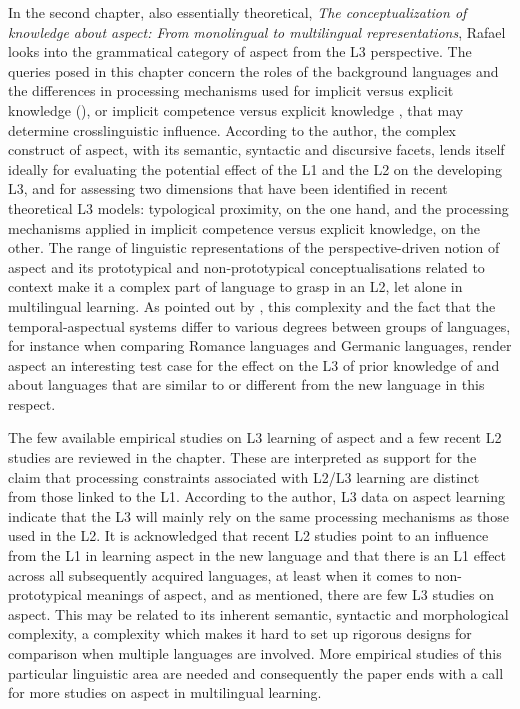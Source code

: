 \documentclass[output=paper,colorlinks,citecolor=brown,nonflat]{langsci/langscibook}
\begin{document}
In the second chapter, also essentially theoretical, \textit{The conceptualization of knowledge about aspect: From monolingual to multilingual representations}, Rafael \citeauthor{chapters/salaberry} looks into the grammatical category of aspect from the L3 perspective. The queries posed in this chapter concern the roles of the background languages and the differences in processing mechanisms used for implicit versus explicit knowledge (\citealt{EllisN2005}), or implicit competence versus explicit knowledge \citep{Paradis2009}, that may determine crosslinguistic influence. According to the author, the complex construct of aspect, with its semantic, syntactic and discursive facets, lends itself ideally for evaluating the potential effect of the L1 and the L2 on the developing L3, and for assessing two dimensions that have been identified in recent theoretical L3 models: typological proximity, on the one hand, and the processing mechanisms applied in implicit competence versus explicit knowledge, on the other. The range of linguistic representations of the perspective-driven notion of aspect and its prototypical and non-prototypical conceptualisations related to context make it a complex part of language to grasp in an L2, let alone in multilingual learning. As pointed out by \citeauthor{chapters/salaberry}, this complexity and the fact that the temporal-aspectual systems differ to various degrees between groups of languages, for instance when comparing Romance languages and Germanic languages, render aspect an interesting test case for the effect on the L3 of prior knowledge of and about languages that are similar to or different from the new language in this respect.


The few available empirical studies on L3 learning of aspect and a few recent L2 studies are reviewed in the chapter. These are interpreted as support for the claim that processing constraints associated with L2/L3 learning are distinct from those linked to the L1. According to the author, L3 data on aspect learning indicate that the L3 will mainly rely on the same processing mechanisms as those used in the L2. It is acknowledged that recent L2 studies point to an influence from the L1 in learning aspect in the new language and that there is an L1 effect across all subsequently acquired languages, at least when it comes to non-prototypical meanings of aspect, and as mentioned, there are few L3 studies on aspect. This may be related to its inherent semantic, syntactic and morphological complexity, a complexity which makes it hard to set up rigorous designs for comparison when multiple languages are involved. More empirical studies of this particular linguistic area are needed and consequently the paper ends with a call for more studies on aspect in multilingual learning.
\end{document}
